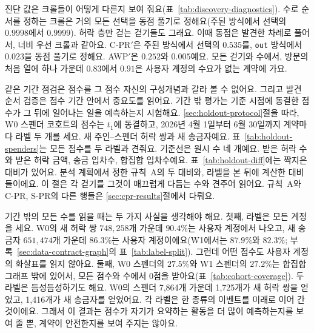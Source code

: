 진단 값은 크롤들이 어떻게 다른지 보여 줘요(표~\ref{tab:discovery-diagnostics}). 수로 순서를 정하는 크롤은 거의 모든 선택을 동점 풀기로 정해요(주된 방식에서 선택의 $0.9998$에서 $0.9999$). 허락 층만 걷는 걷기들도 그래요. 이때 동점은 발견한 차례로 풀어서, 너비 우선 크롤과 같아요. \mbox{C-PR}$'$은 주된 방식에서 선택의 $0.535$를, \texttt{out} 방식에서 $0.023$을 동점 풀기로 정해요. AWP$'$은 $0.252$와 $0.005$예요. 모든 걷기와 수에서, 방문의 처음 열에 하나 가운데 $0.83$에서 $0.91$은 사용자 계정의 수요가 없는 계약에 가요.


같은 기간 점검은 점수를 그 점수 자신의 구성개념과 갈라 볼 수 없어요. 그리고 발견 순서 검증은 점수 기간 안에서 중요도를 읽어요. 기간 밖 평가는 기준 시점에 동결한 점수가 그 뒤에 일어나는 일을 예측하는지 시험해요. \ref{sec:holdout-protocol}절을 따라, W0 스펜더 코호트의 점수는 $t_1$에 동결하고, 2026년 4월 1일부터 6월 30일까지 계약마다 라벨 두 개를 세요. 새 주인--스펜더 허락 쌍과 새 송금자예요. 표~\ref{tab:holdout-spenders}는 모든 점수를 두 라벨과 견줘요. 기준선은 원시 수 네 개예요. 받은 허락 수와 받은 허락 금액, 송금 입차수, 합집합 입차수예요. 표~\ref{tab:holdout-diff}에는 짝지은 대비가 있어요. 분석 계획에서 정한 규칙~A의 두 대비와, 라벨을 본 뒤에 계산한 대비들이에요. 이 절은 각 걷기를 그것이 매끄럽게 다듬는 수와 견주어 읽어요. 규칙~A와 \mbox{C-PR}, \mbox{S-PR}의 다른 행들은 \ref{sec:cpr-results}절에서 다뤄요.

기간 밖의 모든 수를 읽을 때는 두 가지 사실을 생각해야 해요. 첫째, 라벨은 모든 계정을 세요. W0의 새 허락 쌍 $748{,}258$개 가운데 $90.4\%$는 사용자 계정에서 나오고, 새 송금자 $651{,}474$개 가운데 $86.3\%$는 사용자 계정이에요(W1에서는 $87.9\%$와 $82.3\%$; 부록~\ref{sec:data-contract-graph}의 표~\ref{tab:label-split}). 그런데 어떤 점수도 사용자 계정의 화살표를 읽지 않아요. 둘째, W0 스펜더의 $27.5\%$와 W1 스펜더의 $27.2\%$는 합집합 그래프 밖에 있어서, 모든 점수와 수에서 0점을 받아요(표~\ref{tab:cohort-coverage}). 두 라벨은 듬성듬성하기도 해요. W0의 스펜더 7,864개 가운데 1,725개가 새 허락 쌍을 얻었고, 1,416개가 새 송금자를 얻었어요. 각 라벨은 한 종류의 이벤트를 미래로 이어 간 것이에요. 그래서 이 결과는 점수가 자기가 요약하는 활동을 더 많이 예측하는지를 보여 줄 뿐, 계약이 안전한지를 보여 주지는 않아요.





